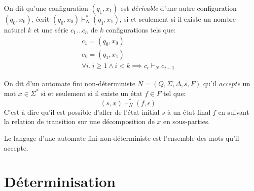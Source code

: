 On dit qu'une configuration $(q_1, x_1)$ est \og \textit{dérivable} \fg{} d'une autre configuration $(q_0, x_0)$, écrit $(q_0, x_0) \vdash_N^* (q_1, x_1)$, si et seulement si il existe un nombre naturel $k$ et une série $c_1 \dots c_n$ de $k$ configurations tels que:
\begin{gather*}
c_1 = (q_0, x_0)\\
c_k = (q_1, x_1)\\
\forall i.\ i \geq 1 \wedge i < k \implies c_i \vdash_N c_{i + 1}
\end{gather*}

On dit d'un automate fini non-déterministe $N = (Q, \Sigma, \Delta, s, F)$ qu'il \og \textit{accepte} \fg{} un mot $x \in \Sigma^*$ si et seulement si il existe un état $f \in F$ tel que:
\[
(s, x) \vdash_N^* (f, \epsilon)
\]
C'est-à-dire qu'il est possible d'aller de l'état initial $s$ à un état final $f$ en suivant la relation de transition sur une décomposition de $x$ en sous-parties.

Le langage d'une automate fini non-déterministe est l'ensemble des mots qu'il accepte.

\section{Déterminisation}

